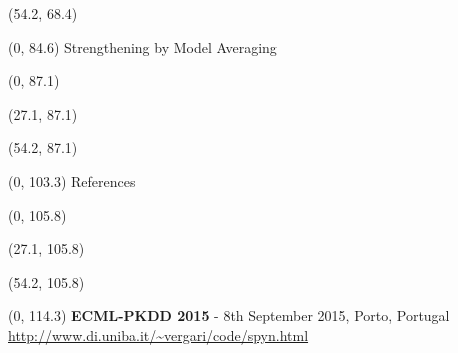 \documentclass[final]{beamer}
\begin{document}
\begin{frame}{}
  \begin{textblock}{25.7}(54.2, 68.4)
    \small
    \blindtext
  \end{textblock}
  
  
  
  \begin{textblock}{80}(0, 84.6)
    Strengthening by Model Averaging
  \end{textblock}
  
  \begin{textblock}{25.7}(0, 87.1)
    \small
    \blindtext
  \end{textblock}
  
  \begin{textblock}{25.7}(27.1, 87.1)
    \small
    \blindtext
  \end{textblock}
  
  \begin{textblock}{25.7}(54.2, 87.1)
    \small
    \blindtext
  \end{textblock}
  
  
  
  \begin{textblock}{80}(0, 103.3)
    References
  \end{textblock}
  

  \begin{textblock}{52}(0, 105.8)
    \small
    \setlength\bibitemsep{8pt}
    \printbibliography
  \end{textblock}
  
  \begin{textblock}{25.7}(27.1, 105.8)
    \small
  \end{textblock}
  
  \begin{textblock}{25.7}(54.2, 105.8)
    \small
  \end{textblock}

  \begin{textblock}{80}(0, 114.3)
    \textbf{ECML-PKDD 2015} - 8th September 2015, Porto, Portugal\hfill
    {\url{http://www.di.uniba.it/~vergari/code/spyn.html}}
  \end{textblock}
  
\end{frame}
\end{document}
